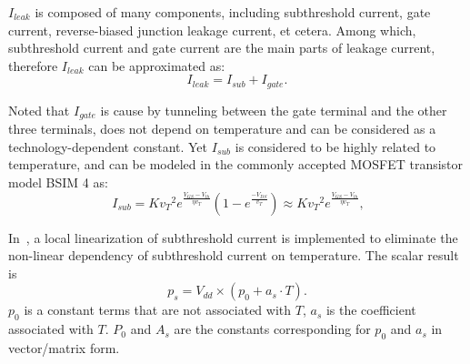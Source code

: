 $I_{leak}$ is composed of many components, including subthreshold current, gate current, reverse-biased junction leakage current, et cetera. Among which, subthreshold current and gate current are the main parts of leakage current, therefore $I_{leak}$ can be approximated as:
\begin{equation}\label{eq:leakage}
I_{leak}=I_{sub}+I_{gate}.
\end{equation}

Noted that $I_{gate}$ is cause by tunneling between the gate terminal and the other three terminals, does not depend on temperature and can be considered as a technology-dependent constant. Yet $I_{sub}$ is considered to be highly related to temperature, and can be modeled in the commonly accepted MOSFET transistor model BSIM 4 as:
\begin{equation}\label{eq:sub_current}\
I_{sub}=K {v_T}^2e^{\frac{V_{GS}-V_{th}}{\eta v_T}}
  (1-e^{\frac{-V_{DS}}{v_T}}) \approx K {v_T}^2e^{\frac{V_{GS}-V_{th}}{\eta v_T}},
\end{equation}

In~\cite{WangWan:TOC'18}, a local linearization of subthreshold current is implemented to eliminate the non-linear dependency of subthreshold current on temperature. The scalar result is
\begin{equation}\label{eq:lin_leakage}
p_{s} = V_{dd} \times (p_{0}+a_{s} \cdot T).
\end{equation}
$p_{0}$ is a constant terms that are not associated with $T$, $a_{s}$ is the coefficient associated with $T$. $P_{0}$ and $A_{s}$ are the constants corresponding for $p_{0}$ and $a_{s}$ in vector/matrix form.



